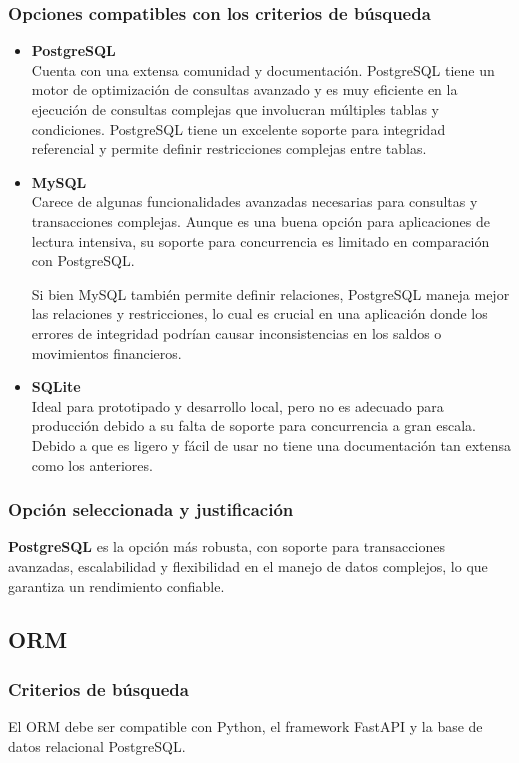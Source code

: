 \subsubsection{Opciones compatibles con los criterios de búsqueda}
\begin{itemize}
    \item \textbf{PostgreSQL}\\
        Cuenta con una extensa comunidad y documentación.
        PostgreSQL tiene un motor de optimización de consultas avanzado y es muy eficiente en la ejecución de consultas complejas que involucran múltiples tablas y condiciones. PostgreSQL tiene un excelente soporte para integridad referencial y permite definir restricciones complejas entre tablas.
    \item \textbf{MySQL}\\
        Carece de algunas funcionalidades avanzadas necesarias para consultas y transacciones complejas. Aunque es una buena opción para aplicaciones de lectura intensiva, su soporte para concurrencia es limitado en comparación con PostgreSQL.

        Si bien MySQL también permite definir relaciones, PostgreSQL maneja mejor las relaciones y restricciones, lo cual es crucial en una aplicación donde los errores de integridad podrían causar inconsistencias en los saldos o movimientos financieros.
        
    \item \textbf{SQLite}\\
        Ideal para prototipado y desarrollo local, pero no es adecuado para producción debido a su falta de soporte para concurrencia a gran escala. Debido a que es ligero y fácil de usar no tiene una documentación tan extensa como los anteriores.
\end{itemize}
\subsubsection{Opción seleccionada y justificación}
\textbf{PostgreSQL} es la opción más robusta, con soporte para transacciones avanzadas, escalabilidad y flexibilidad en el manejo de datos complejos, lo que garantiza un rendimiento confiable.

\subsection{ORM}
\subsubsection{Criterios de búsqueda}
El ORM debe ser compatible con Python, el framework FastAPI y la base de datos relacional PostgreSQL.

